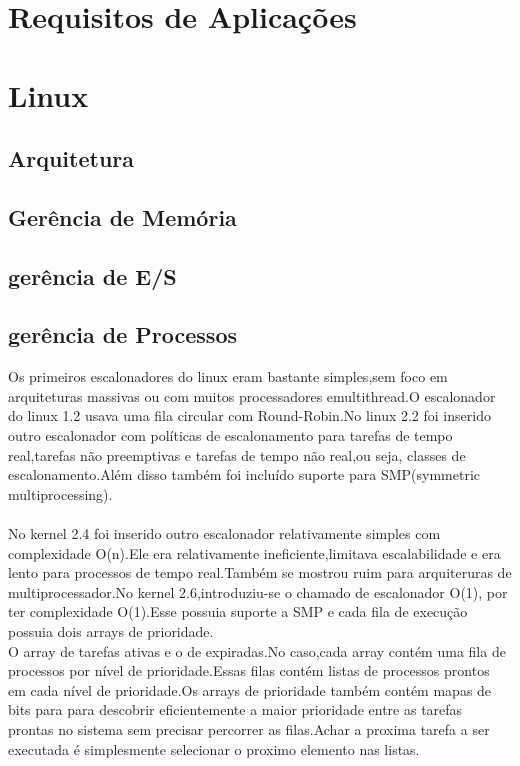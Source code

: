 \documentclass[conference]{IEEEtran}
\begin{document}
\section{Requisitos de Aplicações}\label{sec:req}

\section{Linux}\label{sec:linux}

\subsection{Arquitetura}\label{sec:LinuxArq}

\subsection{Gerência de Memória}\label{sec:LinuxMem}

\subsection{gerência de E/S}\label{sec:LinuxES}

\subsection{gerência de Processos}\label{sec:LinuxPROC}

Os primeiros escalonadores do linux eram bastante simples,sem foco em arquiteturas massivas ou com muitos processadores emultithread.O escalonador do linux 1.2 usava uma fila circular com Round-Robin.No linux 2.2 foi inserido outro escalonador com políticas de escalonamento para tarefas de tempo real,tarefas não preemptivas e tarefas de tempo não real,ou seja, classes de escalonamento.Além disso também foi incluído suporte para SMP(symmetric multiprocessing)\cite{LinuxSchedulerIBM}.\\
\\
 No kernel 2.4 foi  inserido outro escalonador relativamente simples com complexidade O(n).Ele era relativamente ineficiente,limitava escalabilidade e era lento para processos de tempo real.Também se mostrou ruim para arquiteruras de multiprocessador.No kernel 2.6,introduziu-se o chamado de escalonador O(1), por ter complexidade O(1).Esse possuia suporte a SMP e cada fila de execução possuia dois arrays de prioridade.\\

 O array de tarefas ativas e o de expiradas.No caso,cada array contém uma fila de processos por nível de prioridade.Essas filas contém listas de processos prontos em cada nível de prioridade.Os  arrays de prioridade também contém mapas de bits para para descobrir eficientemente a maior prioridade entre as tarefas prontas no sistema sem precisar percorrer as filas.Achar a proxima tarefa a ser executada é simplesmente selecionar o proximo elemento nas listas.\\
\end{document}

